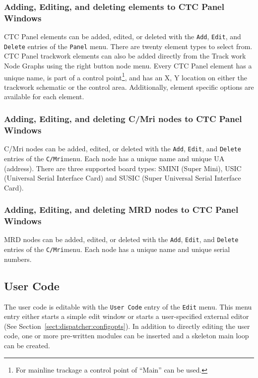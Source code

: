 \subsubsection{Adding, Editing, and deleting elements to CTC Panel Windows}

CTC Panel elements can be added, edited, or deleted with the
\verb=Add=, \verb=Edit=, and \verb=Delete= entries of the \verb=Panel=
menu. There are twenty element types to select from.  CTC Panel
trackwork elements can also be added directly from the Track work Node
Graphs using the right button node menu.  Every CTC Panel element has a
unique name, is part of a control point\footnote{For mainline trackage a
control point of ``Main'' can be used.}, and has an X, Y location on
either the trackwork schematic or the control area. Additionally,
element specific options are available for each element.

\subsubsection{Adding, Editing, and deleting C/Mri nodes to CTC Panel
Windows}

C/Mri nodes can be added, edited, or deleted with the \verb=Add=,
\verb=Edit=, and \verb=Delete= entries of the \verb=C/Mri=menu. Each
node has a unique name and unique UA (address).  There are three
supported board types: SMINI (Super Mini), USIC (Universal Serial
Interface Card) and SUSIC (Super Universal Serial Interface Card).

\subsubsection{Adding, Editing, and deleting MRD nodes to CTC Panel
Windows}

MRD nodes can be added, edited, or deleted with the \verb=Add=,
\verb=Edit=, and \verb=Delete= entries of the \verb=C/Mri=menu. Each
node has a unique name and unique serial numbers.

\subsection{User Code}

The user code is editable with the \verb=User Code= entry of the
\verb=Edit= menu.  This menu entry either starts a simple edit window or
starts a user-specified external editor (See
Section~\ref{sect:dispatcher:configopts}).  In addition to directly
editing the user code, one or more pre-written modules can be inserted
and a skeleton main loop can be created.

